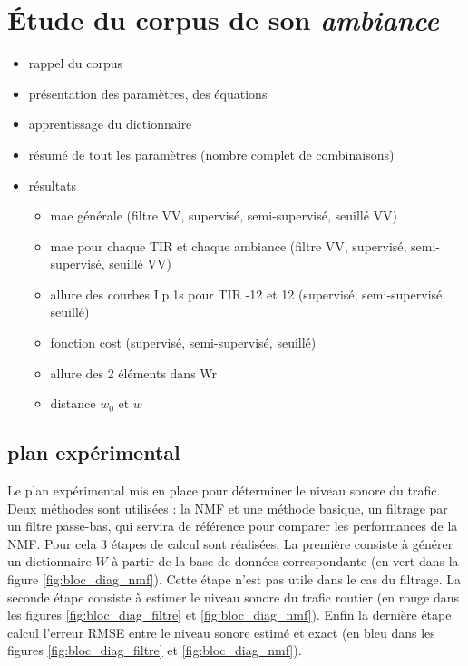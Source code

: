 
\chapter{\'Etude du corpus de son \textit{ambiance}}

\begin{itemize}
\item rappel du corpus
\item présentation des paramètres, des équations
\item apprentissage du dictionnaire
\item résumé de tout les paramètres (nombre complet de combinaisons)
\item résultats
\begin{itemize}
\item mae générale (filtre VV, supervisé, semi-supervisé, seuillé VV)
\item mae pour chaque TIR et chaque ambiance (filtre VV, supervisé, semi-supervisé, seuillé VV)
\item allure des courbes Lp,1s pour TIR -12 et 12 (supervisé, semi-supervisé, seuillé)
\item fonction cost (supervisé, semi-supervisé, seuillé)
\item allure des 2 éléments dans Wr
\item distance $w_0$ et $w$
\end{itemize}

\end{itemize}

\section{plan expérimental}

Le plan expérimental mis en place pour déterminer le niveau sonore du trafic. Deux méthodes sont utilisées : la NMF et une méthode basique, un filtrage par un filtre passe-bas, qui servira de référence pour comparer les performances de la NMF. Pour cela 3 étapes de calcul sont réalisées. La première consiste à générer un dictionnaire $W$ à partir de la base de données correspondante (en vert dans la figure \ref{fig:bloc_diag_nmf}). Cette étape n'est pas utile dans le cas du filtrage. La seconde étape consiste à estimer le niveau sonore du trafic routier (en rouge dans les figures \ref{fig:bloc_diag_filtre} et \ref{fig:bloc_diag_nmf}). Enfin la dernière étape calcul l'erreur RMSE entre le niveau sonore estimé et exact (en bleu dans les figures \ref{fig:bloc_diag_filtre} et \ref{fig:bloc_diag_nmf}). \\

